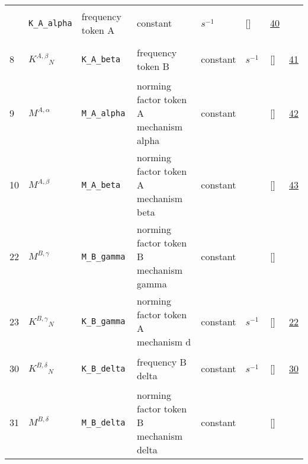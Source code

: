 \begin{longtable}{|p{1cm}|p{3cm}|p{3cm}|p{7cm}|p{3.0cm}|p{3cm}|p{2cm}|p{1cm}|}
             & \verb|K_A_alpha|
             & frequency token A
             & \begin{lay}constant \end{lay}
             & $ s^{-1} \, $
             & []
             & \hyperlink{"e:40"}{ 40 }
                 \\
    8
             & \hypertarget{"v:8"}{ $ {{K^{A,\beta}}}{_{N}} $}
             & \verb|K_A_beta|
             & frequency token B
             & \begin{lay}constant \end{lay}
             & $ s^{-1} \, $
             & []
             & \hyperlink{"e:41"}{ 41 }
                 \\
    9
             & \hypertarget{"v:9"}{ $ {{M^{A,\alpha}}}{_{}} $}
             & \verb|M_A_alpha|
             & norming factor token A mechanism alpha
             & \begin{lay}constant \end{lay}
             & $  $
             & []
             & \hyperlink{"e:42"}{ 42 }
                 \\
    10
             & \hypertarget{"v:10"}{ $ {{M^{A,\beta}}}{_{}} $}
             & \verb|M_A_beta|
             & norming factor token A mechanism beta
             & \begin{lay}constant \end{lay}
             & $  $
             & []
             & \hyperlink{"e:43"}{ 43 }
                 \\
    22
             & \hypertarget{"v:22"}{ $ {{M^{B,\gamma}}}{_{}} $}
             & \verb|M_B_gamma|
             & norming factor token B mechanism gamma
             & \begin{lay}constant \end{lay}
             & $  $
             & []
             & \\
    23
             & \hypertarget{"v:23"}{ $ {{K^{B,\gamma}}}{_{N}} $}
             & \verb|K_B_gamma|
             & norming factor token A mechanism d
             & \begin{lay}constant \end{lay}
             & $ s^{-1} \, $
             & []
             & \hyperlink{"e:22"}{ 22 }
                 \\
    30
             & \hypertarget{"v:30"}{ $ {{K^{B,\delta}}}{_{N}} $}
             & \verb|K_B_delta|
             & frequency B delta
             & \begin{lay}constant \end{lay}
             & $ s^{-1} \, $
             & []
             & \hyperlink{"e:30"}{ 30 }
                 \\
    31
             & \hypertarget{"v:31"}{ $ {{M^{B,\delta}}}{_{}} $}
             & \verb|M_B_delta|
             & norming factor token B mechanism delta
             & \begin{lay}constant \end{lay}
             & $  $
             & []
             & \\
    \end{longtable}